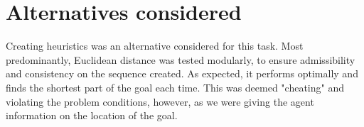 \documentclass{article}
\begin{document}
\section{Alternatives considered}

Creating heuristics was an alternative considered for this task. Most
predominantly, Euclidean distance was tested modularly, to ensure admissibility
and consistency on the sequence created. As expected, it performs optimally and
finds the shortest part of the goal each time. This was deemed "cheating" and
violating the problem conditions, however, as we were giving the agent
information on the location of the goal.



\end{document}
